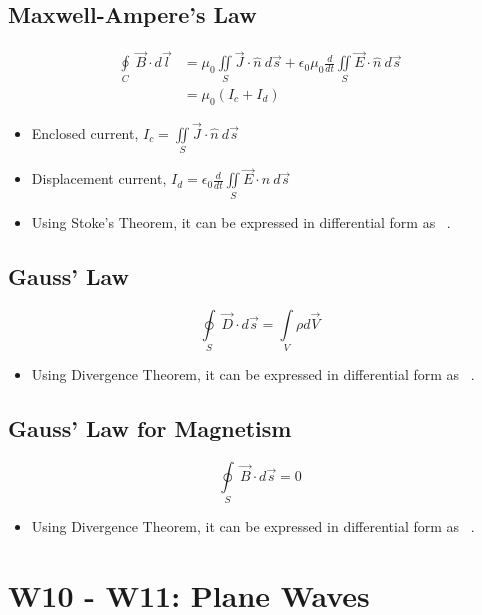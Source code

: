 \documentclass[a4paper]{article}
\begin{document}
\subsection{Maxwell-Ampere's Law}
\begin{align*}
    \oint\limits_{C}\ \overrightarrow{B}\cdot d\vec{l} &= \mu_0\iint\limits_{S}\overrightarrow{J}\cdot\hat{n}\ d\vec{s}+\epsilon_0\mu_0\frac{d}{dt}\iint\limits_{S}\overrightarrow{E}\cdot\hat{n}\ d\vec{s}\\
    &= \mu_0(I_c+I_d)
\end{align*}
\begin{itemize}
    \item Enclosed current, $I_c = \iint\limits_{S}\overrightarrow{J}\cdot\hat{n}\ d\vec{s}$
    \item Displacement current, $I_d = \epsilon_0\displaystyle\frac{d}{dt}\iint\limits_{S}\overrightarrow{E}\cdot\hat{n}\ d\vec{s}$
    \item Using Stoke's Theorem, it can be expressed in differential form as \ .
\end{itemize}

\subsection{Gauss' Law}
$$\oint\limits_{S}\ \overrightarrow{D}\cdot d\vec{s} = \int\limits_{V}\rho d\vec{V}$$
\begin{itemize}
    \item Using Divergence Theorem, it can be expressed in differential form as \ .
\end{itemize}

\subsection{Gauss' Law for Magnetism}
$$\oint\limits_{S}\ \overrightarrow{B}\cdot d\vec{s} = 0$$
\begin{itemize}
    \item Using Divergence Theorem, it can be expressed in differential form as \ .
\end{itemize}

\newpage
\section{W10 - W11: Plane Waves}
\end{document}
